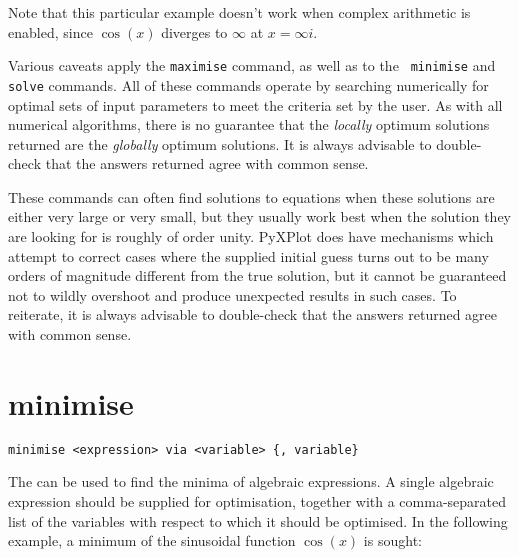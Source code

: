 \vspace{3mm}
\newline
{}\newline
{}\newline
{}\newline
{}
\vspace{3mm}

\noindent Note that this particular example doesn't work when complex
arithmetic is enabled, since $\cos(x)$ diverges to $\infty$ at $x=\infty i$.

Various caveats apply the {\tt maximise} command, as well as to the {\tt
minimise} and {\tt solve} commands.  All of these commands operate by searching
numerically for optimal sets of input parameters to meet the criteria set by
the user. As with all numerical algorithms, there is no guarantee that the {\it
locally} optimum solutions returned are the {\it globally} optimum solutions.
It is always advisable to double-check that the answers returned agree with
common sense.

These commands can often find solutions to equations when these solutions are
either very large or very small, but they usually work best when the solution
they are looking for is roughly of order unity.  PyXPlot does have mechanisms
which attempt to correct cases where the supplied initial guess turns out to be
many orders of magnitude different from the true solution, but it cannot be
guaranteed not to wildly overshoot and produce unexpected results in such
cases.  To reiterate, it is always advisable to double-check that the answers
returned agree with common sense.


\section{minimise}

\begin{verbatim}
minimise <expression> via <variable> {, variable}
\end{verbatim}

The  can be used to find the minima of algebraic expressions.
A single algebraic expression should be supplied for optimisation, together
with a comma-separated list of the variables with respect to which it should be
optimised. In the following example, a minimum of the sinusoidal function
$\cos(x)$ is sought:

